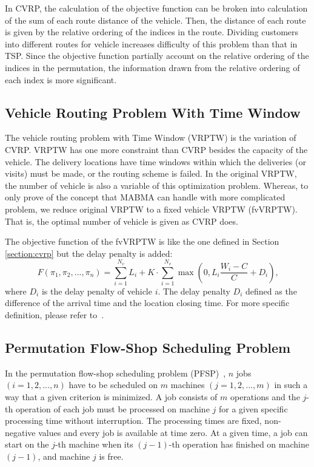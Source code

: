 In  CVRP, the calculation of the objective function can be broken into calculation of the sum of each route distance of the vehicle. Then, the distance of each route is given by the relative ordering of the indices in the route. Dividing customers into different routes for vehicle increases difficulty of this problem than that in TSP. Since the objective function partially account on the relative ordering of the indices in the permutation, the information drawn from the relative ordering of each index is more significant. 

\subsection*{Vehicle Routing Problem With Time Window}
The vehicle routing problem with Time Window (VRPTW)\citep{toth2001vehicle} is the variation of CVRP. VRPTW has one more constraint than CVRP besides the capacity of the vehicle. The delivery locations have time windows within which the deliveries (or visits) must be made, or the routing scheme is failed. In the original VRPTW, the number of vehicle is also a variable of this optimization problem. Whereas, to only prove of the concept that MABMA can handle with more complicated problem, we reduce original VRPTW to a fixed vehicle VRPTW (fvVRPTW). That is, the optimal number of vehicle is given as CVRP does. 

The objective function of the fvVRPTW is like the one defined in Section \ref{section:cvrp} but the delay penalty is added:
\begin{equation*}
	F(\pi_1, \pi_2, ... , \pi_n) = \sum_{i=1}^{N_v}{L_i} + K\cdot\sum_{i=1}^{N_v}{ \max{\left(0,L_i\frac{W_i-C}{C} + D_i\right)}} \text{,}
\end{equation*}
where $D_i$ is the delay penalty of vehicle $i$. The delay penalty $D_i$ defined as the difference of the arrival time and the location closing time. For more specific definition, please refer to~\citep{toth2001vehicle}.

\subsection{Permutation Flow-Shop Scheduling Problem}
In the permutation flow-shop scheduling problem (PFSP)~\citep{gupta2006flowshop, french1982sequencing, allahverdi2008survey}, $n$ jobs $(i = 1,2,...,n)$ have to be scheduled on $m$ machines $(j = 1,2,...,m)$ in such a way that a given criterion is minimized. A job consists of $m$ operations and the $j$-th operation of each job must be processed on machine $j$ for a given specific processing time without interruption. The processing times are fixed, non-negative values and every job is available at time zero. At a given time, a job can start on the $j$-th machine when its $(j-1)$-th operation has finished on machine $(j-1)$, and machine $j$ is free. 

